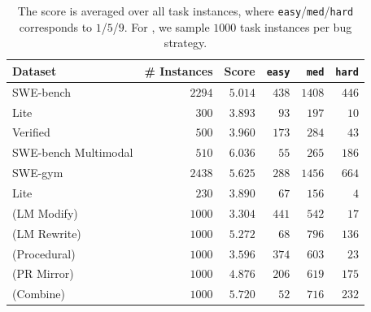 \begin{table}[b]
    \centering
    \begin{tabular}{l|rrrrr}
    \toprule
        Dataset & \# Instances & Score & \texttt{easy} & \texttt{med} & \texttt{hard} \\
    \midrule
        SWE-bench            & $2294$ & $5.014$ & $438$ & $1408$ & $446$ \\
        \quad Lite           & $300$  & $3.893$ & $93$  & $197$  & $10$ \\
        \quad Verified       & $500$  & $3.960$ & $173$ & $284$  & $43$ \\
        SWE-bench Multimodal & $510$  & $6.036$ & $55$  & $265$  & $186$ \\
        SWE-gym              & $2438$ & $5.625$ & $288$ & $1456$ & $664$ \\
        \quad Lite           & $230$  & $3.890$ & $67$  & $156$  & $4$   \\
    \midrule
        \bugs{} (LM Modify)  & $1000$ & $3.304$ & $441$ & $542$ & $17$ \\
        \bugs{} (LM Rewrite) & $1000$ & $5.272$ & $68$  & $796$ & $136$ \\
        \bugs{} (Procedural) & $1000$ & $3.596$ & $374$ & $603$ & $23$ \\
        \bugs{} (PR Mirror)  & $1000$ & $4.876$ & $206$ & $619$ & $175$ \\
        \bugs{} (Combine)    & $1000$ & $5.720$ & $52$  & $716$ & $232$ \\
    \bottomrule
    \end{tabular}
    \caption{
    The score is averaged over all task instances, where \texttt{easy}/\texttt{med}/\texttt{hard} corresponds to $1$/$5$/$9$.
    For \bugs{}, we sample $1000$ task instances per bug strategy.
    }
    \label{tab:difficulty_scores}
\end{table}